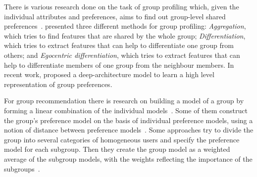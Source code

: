 There is various research done on the task of group profiling which, given the individual attributes and preferences, aims to find out group-level shared preferences~\cite{Senot:2011,Masthoff:2011}.
\citet{Tang:2011} presented three different methods for group profiling: \textsl{Aggregation}, which tries to find features that are shared by the whole group; \textsl{Differentiation}, which tries to extract features that can help to differentiate one group from others; and \textsl{Egocentric differentiation}, which tries to extract features that can help to differentiate members of one group from the neighbour members. In recent work, \citet{Hu:2014} proposed a deep-architecture model to learn a high level representation of group preferences.

For group recommendation there is research on building a model of a group by forming a linear combination of the individual models~\citep{Jameson:2007}. Some of them construct the group's preference model on the basis of individual preference models, using a notion of distance between preference models~\citep{Yu:2006}. Some approaches try to divide the group into several categories of homogeneous users and specify the preference model for each subgroup. Then they create the group model as a weighted average of the subgroup models, with the weights reflecting the importance of the subgroups~\citep{Ardissono:2003}.
